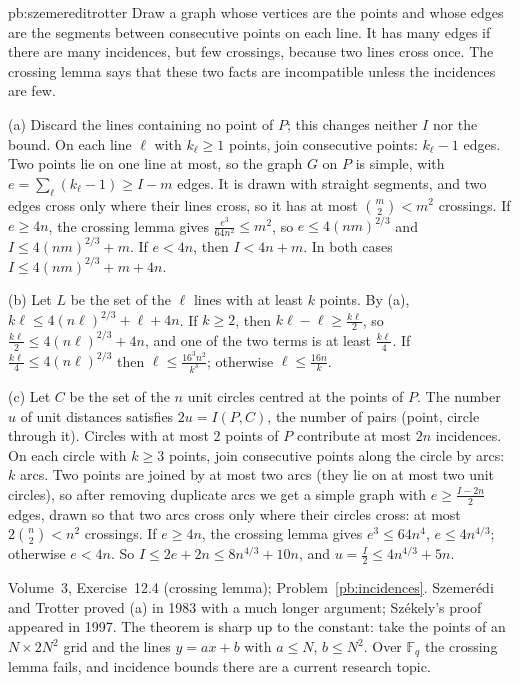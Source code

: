 \begin{solution}{pb:szemereditrotter}
\idea Draw a graph whose vertices are the points and whose edges are the segments between consecutive points on each line. It
has many edges if there are many incidences, but few crossings, because two lines cross once. The crossing lemma says that
these two facts are incompatible unless the incidences are few.

\writeup (a) Discard the lines containing no point of $P$; this changes neither $I$ nor the bound. On each line $\ell$ with $k_\ell\ge1$
points, join consecutive points: $k_\ell-1$ edges. Two points lie on one line at most, so the graph $G$ on $P$ is simple, with
$e=\sum_\ell(k_\ell-1)\ge I-m$ edges. It is drawn with straight segments, and two edges cross only where their lines cross, so it has
at most $\binom m2<m^2$ crossings. If $e\ge4n$, the crossing lemma gives $\frac{e^3}{64n^2}\le m^2$, so $e\le4(nm)^{2/3}$ and
$I\le4(nm)^{2/3}+m$. If $e<4n$, then $I<4n+m$. In both cases $I\le4(nm)^{2/3}+m+4n$.

(b) Let $L$ be the set of the $\ell$ lines with at least $k$ points. By (a), $k\ell\le4(n\ell)^{2/3}+\ell+4n$. If $k\ge2$, then
$k\ell-\ell\ge\frac{k\ell}2$, so $\frac{k\ell}2\le4(n\ell)^{2/3}+4n$, and one of the two terms is at least $\frac{k\ell}4$. If $\frac{k\ell}4\le4(n\ell)^{2/3}$
then $\ell\le\frac{16^3n^2}{k^3}$; otherwise $\ell\le\frac{16n}k$.

(c) Let $C$ be the set of the $n$ unit circles centred at the points of $P$. The number $u$ of unit distances satisfies
$2u=I(P,C)$, the number of pairs (point, circle through it). Circles with at most $2$ points of $P$ contribute at most $2n$ incidences.
On each circle with $k\ge3$ points, join consecutive points along the circle by arcs: $k$ arcs. Two points are joined by at most
two arcs (they lie on at most two unit circles), so after removing duplicate arcs we get a simple graph with
$e\ge\frac{I-2n}2$ edges, drawn so that two arcs cross only where their circles cross: at most $2\binom n2<n^2$ crossings. If $e\ge4n$, the
crossing lemma gives $e^3\le64n^4$, $e\le4n^{4/3}$; otherwise $e<4n$. So $I\le2e+2n\le8n^{4/3}+10n$, and $u=\frac I2\le4n^{4/3}+5n$.

\tools Volume~3, Exercise~12.4 (crossing lemma); Problem~\ref{pb:incidences}.
\leads Szemerédi and Trotter proved (a) in 1983 with a much longer argument; Székely's proof appeared in 1997. The theorem is sharp
up to the constant: take the points of an $N\times2N^2$ grid and the lines $y=ax+b$ with $a\le N$, $b\le N^2$. Over $\mathbb F_q$ the
crossing lemma fails, and incidence bounds there are a current research topic.
\end{solution}

